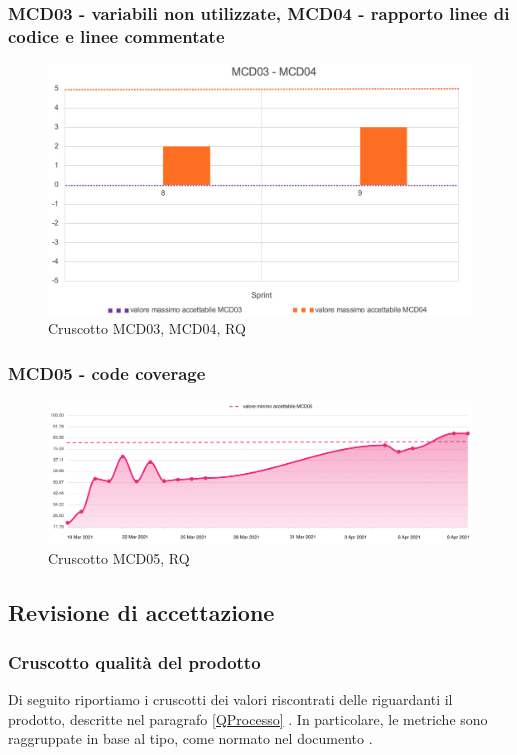 \subsubsection*{MCD03 - variabili non utilizzate, MCD04 - rapporto linee di codice e linee commentate}
\begin{figure}[H] 
    \centering
    \includegraphics[scale = 0.6]{immagini/MCD03-04.png}
    \caption{Cruscotto MCD03, MCD04, RQ}
\end{figure}

\subsubsection*{MCD05 - code coverage}
\begin{figure}[H] 
    \centering
    \includegraphics[scale = 0.4]{immagini/MCD05.png}
    \caption{Cruscotto MCD05, RQ}
\end{figure}

\newpage

\subsection{Revisione di accettazione}
\subsubsection{Cruscotto qualità del prodotto}
Di seguito riportiamo i cruscotti dei valori riscontrati delle  riguardanti il prodotto, descritte nel paragrafo \ref{QProcesso} .  In particolare, le metriche sono raggruppate in base al tipo, come normato nel documento \NdP{}.
